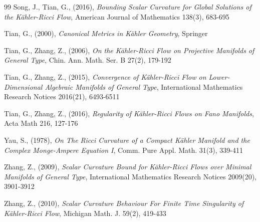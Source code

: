 \documentclass[12pt]{article}
\numberwithin{equation}{section}
\begin{document}
\begin{thebibliography}{99}
 Song, J., Tian, G., (2016), 
\textit{Bounding Scalar Curvature for Global Solutions of the K\"ahler-Ricci Flow}, 
American Journal of Mathematics 138(3), 683-695

 Tian, G., (2000), 
\textit{Canonical Metrics in K\"ahler Geometry}, 
Springer

 Tian, G., Zhang, Z., (2006), 
\textit{On the K\"ahler-Ricci Flow on Projective Manifolds of General Type}, 
Chin. Ann. Math. Ser. B 27(2), 179-192

 Tian, G., Zhang, Z., (2015),
\textit{Convergence of K\"ahler-Ricci Flow on Lower-Dimensional Algebraic Manifolds of General Type}, 
International Mathematics Research Notices 2016(21), 6493-6511

 Tian, G., Zhang, Z., (2016), 
\textit{Regularity of K\"ahler-Ricci Flows on Fano Manifolds}, 
Acta Math 216, 127-176

 Yau, S., (1978), 
\textit{On The Ricci Curvature of a Compact K\"ahler Manifold and the Complex Monge-Ampere Equation I}, 
Comm. Pure Appl. Math. 31(3), 339-411

 Zhang, Z., (2009),
\textit{Scalar Curvature Bound for K\"ahler-Ricci Flows over Minimal Manifolds of General Type},
International Mathematics Research Notices 2009(20), 3901-3912

 Zhang, Z., (2010), 
\textit{Scalar Curvature Behaviour For Finite Time Singularity of K\"ahler-Ricci Flow}, 
Michigan Math. J. 59(2), 419-433

\end{thebibliography}
\end{document}
